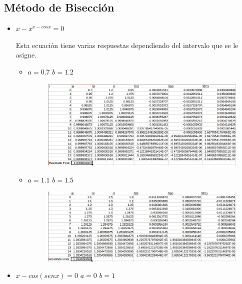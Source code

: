 \documentclass[a4paper,12pt]{article}
\begin{document}
    \newpage

    \subsection{Método de Bisección}
    
    \begin{itemize}
     \item $x-x^{x-cosx} = 0$ 
     
     Esta ecuación tiene varias respuestas dependiendo del intervalo que se le asigne.
     
     \begin{itemize}
      \item $a = 0.7$ $b = 1.2$
      \begin{figure}[h]
      \centering
      \includegraphics[scale = 0.4]{21.eps}
     \end{figure}
      
      \item $a = 1.1$ $b = 1.5$
      
      \begin{figure}[h]
      \centering
      \includegraphics[scale = 0.4]{212.eps}
     \end{figure}
      
     \end{itemize}

     
     
     
     
     
     \item $x-cos(senx) = 0$ $a = 0$ $b = 1$
      

\end{itemize}
\end{document}
